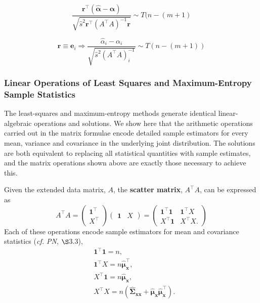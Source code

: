 \documentclass[12pt, twoside, draft]{article}
\begin{document}
\begin{equation}
\frac{\mathbf{r}^\top (\hat{\boldsymbol{\alpha}} - \boldsymbol{\alpha})}{\sqrt{\hat{s}^2 \mathbf{r}^\top (A^\top A)^{-1} \mathbf{r}}} \sim T(n-(m+1)
\end{equation}




\begin{equation}
\mathbf{r} \equiv \mathbf{e}_i \Rightarrow \frac{\hat{\alpha}_i - \alpha_i}{\sqrt{\hat{s}^2 (A^\top A)^{-1}_i}} \sim T(n-(m+1))
\end{equation}



\subsubsection{Linear Operations of Least Squares and Maximum-Entropy Sample Statistics}
The least-squares and maximum-entropy methods generate identical linear-algebraic operations and solutions.  We show here that the arithmetic operations carried out in the matrix formulae encode detailed sample estimators for every mean, variance and covariance in the underlying joint distribution.  The solutions are both equivalent to replacing all statistical quantities with sample estimates, and the matrix operations shown above are exactly those necessary to achieve this.

Given the extended data matrix, $A$, the \textbf{scatter matrix}, $A^\top A$, can be expressed as
\begin{equation}\label{eq:partitioned_scatter_matrix}
A^\top A = \begin{pmatrix} \mathbf{1}^\top \\ X^\top \end{pmatrix} \begin{pmatrix} \mathbf{1} & X \end{pmatrix} 
= \begin{pmatrix} \mathbf{1}^\top \mathbf{1} & \mathbf{1}^\top X \\ 
X^\top \mathbf{1} & X^\top X.
\end{pmatrix}
\end{equation}
Each of these operations encode sample estimators for mean and covariance statistics (\textit{cf. PN}, $\S$3.3),
\begin{align}
&\mathbf{1}^\top \mathbf{1} = n, \\
&\mathbf{1}^\top X =  n \hat{\boldsymbol{\mu}}^\top_{\mathbf{x}}, \\
&X^\top \mathbf{1} = n \hat{\boldsymbol{\mu}}_{\mathbf{x}}, \\
&X^\top X = n\left(\hat{\boldsymbol{\Sigma}}_{\mathbf{x}\mathbf{x}} +  \hat{\boldsymbol{\mu}}_{\mathbf{x}}\hat{\boldsymbol{\mu}}^\top_{\mathbf{x}}\right).
\end{align}
\end{document}
